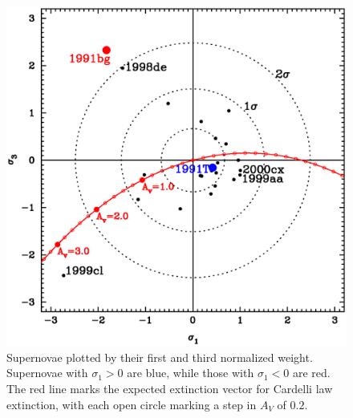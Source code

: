 \begin{figure}[ht]
\begin{center}
\includegraphics[angle=0,scale=0.8]{./figures/pca/sigma1_vs_sigma3_areanorm.ps}
\end{center}
\caption{
Supernovae plotted by their first and third normalized weight. Supernovae with $\sigma_{1} > 0$ are blue, while those with $\sigma_{1} < 0$ are red. The red line marks the expected extinction vector for Cardelli law extinction, with each open circle marking a step in $A_{V}$ of $0.2$.
}
\label{fig:sig1sig3}
\end{figure}

